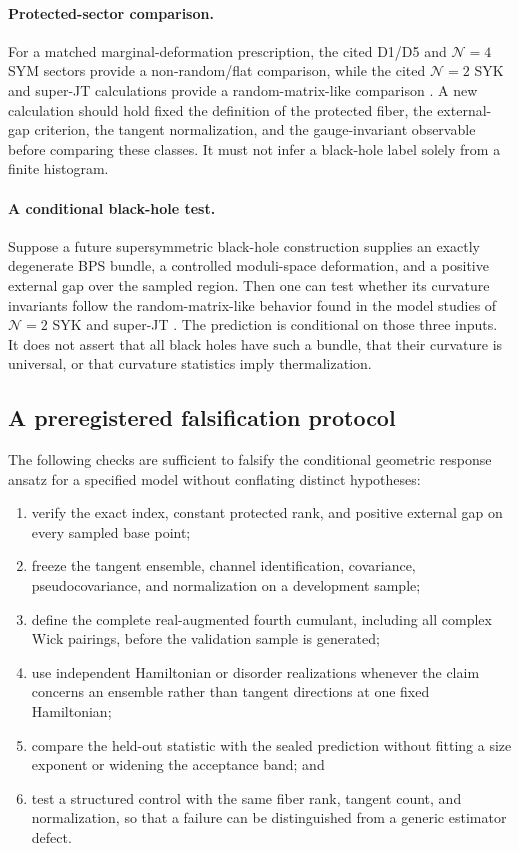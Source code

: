\paragraph{Protected-sector comparison.}
For a matched marginal-deformation prescription, the cited D1/D5 and
$\mathcal{N}=4$ SYM sectors provide a non-random/flat comparison, while the
cited $\mathcal{N}=2$ SYK and super-JT calculations provide a random-matrix-like
comparison \cite{chen2026berry}.  A new calculation should hold fixed the
definition of the protected fiber, the external-gap criterion, the tangent
normalization, and the gauge-invariant observable before comparing these
classes.  It must not infer a black-hole label solely from a finite histogram.

\paragraph{A conditional black-hole test.}
Suppose a future supersymmetric black-hole construction supplies an exactly
degenerate BPS bundle, a controlled moduli-space deformation, and a positive
external gap over the sampled region.  Then one can test whether its curvature
invariants follow the random-matrix-like behavior found in the model studies
of $\mathcal{N}=2$ SYK and super-JT \cite{chen2026berry}.  The prediction is
conditional on those three inputs.  It does not assert that all black holes
have such a bundle, that their curvature is universal, or that curvature
statistics imply thermalization.

\subsection{A preregistered falsification protocol}

The following checks are sufficient to falsify the conditional geometric
response ansatz for a specified model without conflating distinct hypotheses:
\begin{enumerate}
  \item verify the exact index, constant protected rank, and positive external
  gap on every sampled base point;
  \item freeze the tangent ensemble, channel identification, covariance,
  pseudocovariance, and normalization on a development sample;
  \item define the complete real-augmented fourth cumulant, including all
  complex Wick pairings, before the validation sample is generated;
  \item use independent Hamiltonian or disorder realizations whenever the
  claim concerns an ensemble rather than tangent directions at one fixed
  Hamiltonian;
  \item compare the held-out statistic with the sealed prediction without
  fitting a size exponent or widening the acceptance band; and
  \item test a structured control with the same fiber rank, tangent count, and
  normalization, so that a failure can be distinguished from a generic
  estimator defect.
\end{enumerate}

